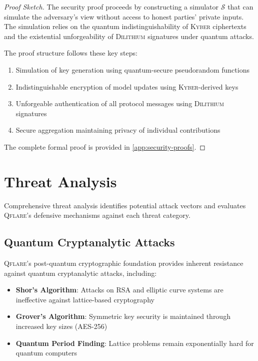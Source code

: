 ﻿\documentclass[12pt,a4paper,twoside]{book}
\newcommand{\qflare}{\textsc{Qflare}}
\newcommand{\kyber}{\textsc{Kyber}}
\newcommand{\dilithium}{\textsc{Dilithium}}
\begin{document}
\begin{proof}[Proof Sketch]
The security proof proceeds by constructing a simulator $\mathcal{S}$ that can simulate the adversary's view without access to honest parties' private inputs. The simulation relies on the quantum indistinguishability of \kyber{} ciphertexts and the existential unforgeability of \dilithium{} signatures under quantum attacks.

The proof structure follows these key steps:
\begin{enumerate}
\item Simulation of key generation using quantum-secure pseudorandom functions
\item Indistinguishable encryption of model updates using \kyber{}-derived keys
\item Unforgeable authentication of all protocol messages using \dilithium{} signatures
\item Secure aggregation maintaining privacy of individual contributions
\end{enumerate}

The complete formal proof is provided in \cref{app:security-proofs}.
\end{proof}

\section{Threat Analysis}
\label{sec:threat-analysis}

Comprehensive threat analysis identifies potential attack vectors and evaluates \qflare{}'s defensive mechanisms against each threat category.

\subsection{Quantum Cryptanalytic Attacks}
\label{subsec:quantum-attacks}

\qflare{}'s post-quantum cryptographic foundation provides inherent resistance against quantum cryptanalytic attacks, including:

\begin{itemize}
\item \textbf{Shor's Algorithm}: Attacks on RSA and elliptic curve systems are ineffective against lattice-based cryptography
\item \textbf{Grover's Algorithm}: Symmetric key security is maintained through increased key sizes (AES-256)
\item \textbf{Quantum Period Finding}: Lattice problems remain exponentially hard for quantum computers
\end{itemize}
\end{document}

